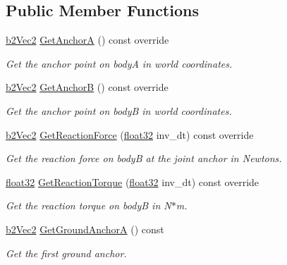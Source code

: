 \subsection*{Public Member Functions}
\begin{DoxyCompactItemize}
\item 
\mbox{\hyperlink{structb2_vec2}{b2\+Vec2}} \mbox{\hyperlink{classb2_pulley_joint_af7167643e6d72d879eea619a368194c1}{Get\+AnchorA}} () const override
\begin{DoxyCompactList}\small\item\em Get the anchor point on bodyA in world coordinates. \end{DoxyCompactList}\item 
\mbox{\hyperlink{structb2_vec2}{b2\+Vec2}} \mbox{\hyperlink{classb2_pulley_joint_aee56f103c1d1d30fcbd3a8570e321ba9}{Get\+AnchorB}} () const override
\begin{DoxyCompactList}\small\item\em Get the anchor point on bodyB in world coordinates. \end{DoxyCompactList}\item 
\mbox{\hyperlink{structb2_vec2}{b2\+Vec2}} \mbox{\hyperlink{classb2_pulley_joint_a90904a458169a22fe0a9e2c4f5332101}{Get\+Reaction\+Force}} (\mbox{\hyperlink{b2_settings_8h_aacdc525d6f7bddb3ae95d5c311bd06a1}{float32}} inv\+\_\+dt) const override
\begin{DoxyCompactList}\small\item\em Get the reaction force on bodyB at the joint anchor in Newtons. \end{DoxyCompactList}\item 
\mbox{\hyperlink{b2_settings_8h_aacdc525d6f7bddb3ae95d5c311bd06a1}{float32}} \mbox{\hyperlink{classb2_pulley_joint_a707bed4e4541d5da58022a6ee2bc58a1}{Get\+Reaction\+Torque}} (\mbox{\hyperlink{b2_settings_8h_aacdc525d6f7bddb3ae95d5c311bd06a1}{float32}} inv\+\_\+dt) const override
\begin{DoxyCompactList}\small\item\em Get the reaction torque on bodyB in N$\ast$m. \end{DoxyCompactList}\item 
\mbox{\hyperlink{structb2_vec2}{b2\+Vec2}} \mbox{\hyperlink{classb2_pulley_joint_a082db0a3ab20f682b9c7d5f41f0cc79e}{Get\+Ground\+AnchorA}} () const
\begin{DoxyCompactList}\small\item\em Get the first ground anchor. \end{DoxyCompactList}\item 

\end{DoxyCompactItemize}
